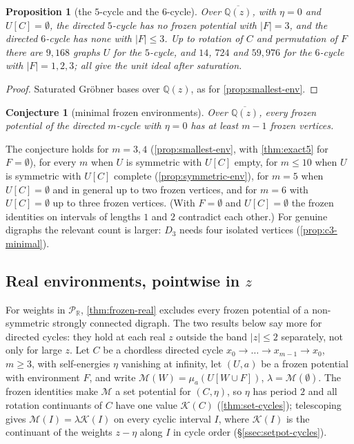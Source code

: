\documentclass[11pt]{amsart}
\theoremstyle{plain}
\newtheorem{proposition}[theorem]{Proposition}
\newtheorem{conjecture}[theorem]{Conjecture}
\theoremstyle{definition}
\theoremstyle{remark}
\numberwithin{equation}{section}
\newcommand{\QQ}{\mathbb{Q}}
\newcommand{\RR}{\mathbb{R}}
\newcommand{\Qz}{\QQ(z)}
\newcommand{\Qzbar}{\overline{\QQ(z)}}
\newcommand{\Puis}{\mathcal{P}_{\RR}}
\newcommand{\Mpot}{\mathcal{M}}           %
\newcommand{\cont}{\mathcal{K}}           %
\begin{document}
\begin{proposition}[the $5$-cycle and the $6$-cycle]\label{prop:c5c6}
Over $\Qzbar$, with $\eta=0$ and $U[C]=\emptyset$, the directed $5$-cycle has no frozen potential with $|F|=3$, and the directed $6$-cycle has none with $|F|\le3$. Up to rotation of $C$ and permutation of $F$ there are $9{,}168$ graphs $U$ for the $5$-cycle, and $14$, $724$ and $59{,}976$ for the $6$-cycle with $|F|=1,2,3$; all give the unit ideal after saturation.
\end{proposition}
\begin{proof}
Saturated Gr\"obner bases over $\Qz$, as for \cref{prop:smallest-env}.
\end{proof}

\begin{conjecture}[minimal frozen environments]\label{conj:minimal-env}
Over $\Qzbar$, every frozen potential of the directed $m$-cycle with $\eta=0$ has at least $m-1$ frozen vertices.
\end{conjecture}

The conjecture holds for $m=3,4$ (\cref{prop:smallest-env}, with \cref{thm:exact5} for $F=\emptyset$), for every $m$ when $U$ is symmetric with $U[C]$ empty, for $m\le10$ when $U$ is symmetric with $U[C]$ complete (\cref{prop:symmetric-env}), for $m=5$ when $U[C]=\emptyset$ and in general up to two frozen vertices, and for $m=6$ with $U[C]=\emptyset$ up to three frozen vertices. (With $F=\emptyset$ and $U[C]=\emptyset$ the frozen identities on intervals of lengths $1$ and $2$ contradict each other.) For genuine digraphs the relevant count is larger: $D_3$ needs four isolated vertices (\cref{prop:c3-minimal}).

\subsection{Real environments, pointwise in \texorpdfstring{$z$}{z}}
For weights in $\Puis$, \cref{thm:frozen-real} excludes every frozen potential of a non-symmetric strongly connected digraph. The two results below say more for directed cycles: they hold at each real $z$ outside the band $|z|\le2$ separately, not only for large $z$. Let $C$ be a chordless directed cycle $x_0\to\dots\to x_{m-1}\to x_0$, $m\ge3$, with self-energies $\eta$ vanishing at infinity, let $(U,a)$ be a frozen potential with environment $F$, and write $\Mpot(W)=\mu_a(U[W\cup F])$, $\lambda=\Mpot(\emptyset)$. The frozen identities make $\Mpot$ a set potential for $(C,\eta)$, so $\eta$ has period $2$ and all rotation continuants of $C$ have one value $\cont(C)$ (\cref{thm:set-cycles}); telescoping gives $\Mpot(I)=\lambda\cont(I)$ on every cyclic interval $I$, where $\cont(I)$ is the continuant of the weights $z-\eta$ along $I$ in cycle order (\S\ref{ssec:setpot-cycles}).
\end{document}
